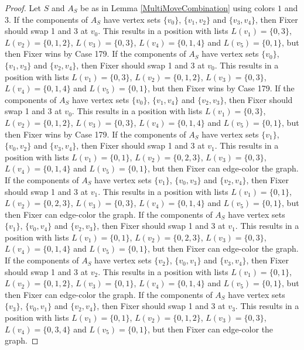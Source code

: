 \documentclass[12pt]{amsart}
\theoremstyle{plain}
\theoremstyle{definition}
\theoremstyle{remark}
\begin{document}
\begin{proof}
Let $S$ and $A_S$ be as in Lemma \ref{MultiMoveCombination} using colors $1$ and $3$. If the components of $A_S$ have vertex sets $\{v_0\}$, $\{v_1, v_2\}$ and $\{v_3, v_4\}$, then Fixer should swap 1 and 3 at $v_0$. This results in a position with lists $L(v_1) = \{0, 3\}$, $L(v_2) = \{0, 1, 2\}$, $L(v_3) = \{0, 3\}$, $L(v_4) = \{0, 1, 4\}$ and $L(v_5) = \{0, 1\}$, but then Fixer wins by Case 179.
If the components of $A_S$ have vertex sets $\{v_0\}$, $\{v_1, v_3\}$ and $\{v_2, v_4\}$, then Fixer should swap 1 and 3 at $v_0$. This results in a position with lists $L(v_1) = \{0, 3\}$, $L(v_2) = \{0, 1, 2\}$, $L(v_3) = \{0, 3\}$, $L(v_4) = \{0, 1, 4\}$ and $L(v_5) = \{0, 1\}$, but then Fixer wins by Case 179.
If the components of $A_S$ have vertex sets $\{v_0\}$, $\{v_1, v_4\}$ and $\{v_2, v_3\}$, then Fixer should swap 1 and 3 at $v_0$. This results in a position with lists $L(v_1) = \{0, 3\}$, $L(v_2) = \{0, 1, 2\}$, $L(v_3) = \{0, 3\}$, $L(v_4) = \{0, 1, 4\}$ and $L(v_5) = \{0, 1\}$, but then Fixer wins by Case 179.
If the components of $A_S$ have vertex sets $\{v_1\}$, $\{v_0, v_2\}$ and $\{v_3, v_4\}$, then Fixer should swap 1 and 3 at $v_1$. This results in a position with lists $L(v_1) = \{0, 1\}$, $L(v_2) = \{0, 2, 3\}$, $L(v_3) = \{0, 3\}$, $L(v_4) = \{0, 1, 4\}$ and $L(v_5) = \{0, 1\}$, but then Fixer can edge-color the graph.
If the components of $A_S$ have vertex sets $\{v_1\}$, $\{v_0, v_3\}$ and $\{v_2, v_4\}$, then Fixer should swap 1 and 3 at $v_1$. This results in a position with lists $L(v_1) = \{0, 1\}$, $L(v_2) = \{0, 2, 3\}$, $L(v_3) = \{0, 3\}$, $L(v_4) = \{0, 1, 4\}$ and $L(v_5) = \{0, 1\}$, but then Fixer can edge-color the graph.
If the components of $A_S$ have vertex sets $\{v_1\}$, $\{v_0, v_4\}$ and $\{v_2, v_3\}$, then Fixer should swap 1 and 3 at $v_1$. This results in a position with lists $L(v_1) = \{0, 1\}$, $L(v_2) = \{0, 2, 3\}$, $L(v_3) = \{0, 3\}$, $L(v_4) = \{0, 1, 4\}$ and $L(v_5) = \{0, 1\}$, but then Fixer can edge-color the graph.
If the components of $A_S$ have vertex sets $\{v_2\}$, $\{v_0, v_1\}$ and $\{v_3, v_4\}$, then Fixer should swap 1 and 3 at $v_2$. This results in a position with lists $L(v_1) = \{0, 1\}$, $L(v_2) = \{0, 1, 2\}$, $L(v_3) = \{0, 1\}$, $L(v_4) = \{0, 1, 4\}$ and $L(v_5) = \{0, 1\}$, but then Fixer can edge-color the graph.
If the components of $A_S$ have vertex sets $\{v_3\}$, $\{v_0, v_1\}$ and $\{v_2, v_4\}$, then Fixer should swap 1 and 3 at $v_3$. This results in a position with lists $L(v_1) = \{0, 1\}$, $L(v_2) = \{0, 1, 2\}$, $L(v_3) = \{0, 3\}$, $L(v_4) = \{0, 3, 4\}$ and $L(v_5) = \{0, 1\}$, but then Fixer can edge-color the graph.

\end{proof}
\end{document}
